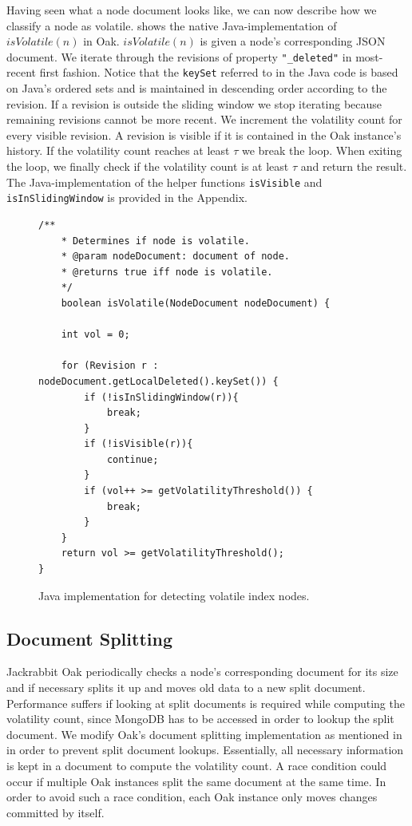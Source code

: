 \documentclass[abstracton,12pt]{scrartcl}
\theoremstyle{definition}
\begin{document}
Having seen what a node document looks like, we can now describe how we classify a node as volatile.
 shows the native Java-implementation of $isVolatile(n)$ in Oak.
$isVolatile(n)$ is given a node's corresponding JSON document.
We iterate through the revisions of property \texttt{"\_deleted"} in most-recent first fashion.
Notice that the \texttt{keySet} referred to in the Java code is based on Java's ordered sets and is maintained in descending order according to the revision.
If a revision is outside the sliding window we stop iterating because remaining revisions cannot be more recent.
We increment the volatility count for every visible revision.
A revision is visible if it is contained in the Oak instance's history.
If the volatility count reaches at least $\tau$ we break the loop.
When exiting the loop, we finally check if the volatility count is at least $\tau$ and return the result.
The Java-implementation of the helper functions \texttt{isVisible} and \texttt{isInSlidingWindow} is provided in the Appendix.

\begin{figure}
    \begin{framed}
        \begin{scriptsize}
            \begin{verbatim}
/**
    * Determines if node is volatile.
    * @param nodeDocument: document of node.
    * @returns true iff node is volatile.
    */            
    boolean isVolatile(NodeDocument nodeDocument) {

    int vol = 0;
    
    for (Revision r : nodeDocument.getLocalDeleted().keySet()) {
        if (!isInSlidingWindow(r)){
            break;
        }
        if (!isVisible(r)){
            continue;
        }
        if (vol++ >= getVolatilityThreshold()) {
            break;
        }
    }
    return vol >= getVolatilityThreshold();
}
\end{verbatim}
        \end{scriptsize}
    \end{framed}
    \caption{Java implementation for detecting volatile index nodes.}
    \label{fig:is_volatile}
\end{figure}

\subsection{Document Splitting}

Jackrabbit Oak periodically checks a node's corresponding document for its size and if necessary splits it up and moves old data to a new split document.
Performance suffers if looking at split documents is required while computing the volatility count, since MongoDB has to be accessed in order to lookup the split document.
We modify Oak's document splitting implementation as mentioned in~\cite{KW17} in order to prevent split document lookups.
Essentially, all necessary information is kept in a document to compute the volatility count.
A race condition could occur if multiple Oak instances split the same document at the same time.
In order to avoid such a race condition, each Oak instance only moves changes committed by itself.
\end{document}
